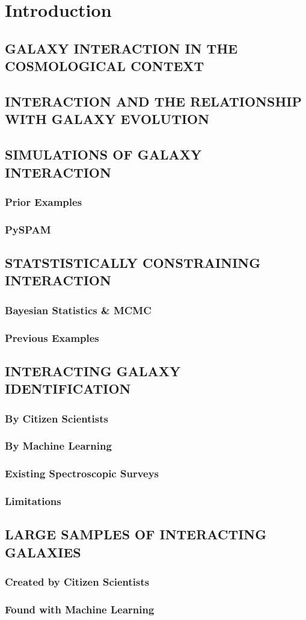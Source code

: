 \chapter{Introduction}
\section{GALAXY INTERACTION IN THE COSMOLOGICAL CONTEXT}
\section{INTERACTION AND THE RELATIONSHIP WITH GALAXY EVOLUTION}
\section{SIMULATIONS OF GALAXY INTERACTION}
\subsection{Prior Examples}
\subsection{PySPAM}
\section{STATSTISTICALLY CONSTRAINING INTERACTION}
\subsection{Bayesian Statistics \& MCMC}
\subsection{Previous Examples}
\section{INTERACTING GALAXY IDENTIFICATION}
\subsection{By Citizen Scientists}
\subsection{By Machine Learning}
\subsection{Existing Spectroscopic Surveys}
\subsection{Limitations}
\section{LARGE SAMPLES OF INTERACTING GALAXIES}
\subsection{Created by Citizen Scientists}
\subsection{Found with Machine Learning}